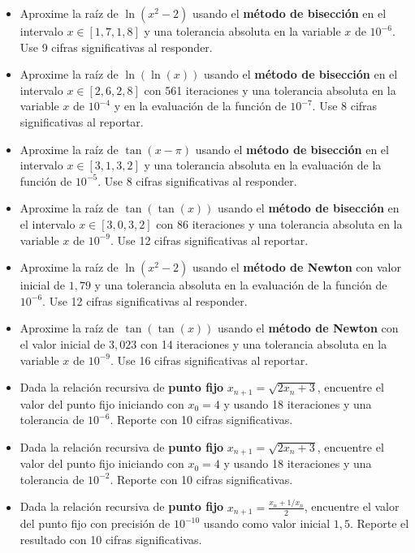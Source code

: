 \documentclass[12pt]{article}
\begin{document}
\begin{itemize}
\item Aproxime la raíz de \(\ln(x^2 - 2)\) usando el \textbf{método de bisección} en el intervalo \(x \in \left[1{,}7, 1{,}8\right]\) y una tolerancia absoluta en la variable \(x\) de \(10^{-6}\). Use 9 cifras significativas al responder.
\item Aproxime la raíz de \(\ln(\ln(x))\)  usando el \textbf{método de bisección} en el intervalo \(x \in \left[2{,}6, 2{,}8\right]\) con 561 iteraciones y una tolerancia absoluta en la variable \(x\) de \(10^{-4}\) y en la evaluación de la función de \(10^{-7}\). Use 8 cifras significativas al reportar.
\item Aproxime la raíz de \(\tan(x - \pi)\) usando el \textbf{método de bisección} en el intervalo \(x \in \left[3{,}1, 3{,}2\right]\) y una tolerancia absoluta en la evaluación de la función de \(10^{-5}\). Use 8 cifras significativas al responder.
\item Aproxime la raíz de \(\tan(\tan(x))\)  usando el \textbf{método de bisección} en el intervalo \(x \in \left[3{,}0, 3{,}2\right]\) con 86 iteraciones y una tolerancia absoluta en la variable \(x\) de \(10^{-9}\). Use 12 cifras significativas al reportar.
\item Aproxime la raíz de \(\ln(x^2 - 2)\)  usando el \textbf{método de Newton} con valor inicial de \(1{,}79\) y una tolerancia absoluta en la evaluación de la función de \(10^{-6}\). Use 12 cifras significativas al responder.
\item Aproxime la raíz de \(\tan(\tan(x))\)  usando el \textbf{método de Newton} con el valor inicial de \(3{,}023\) con 14 iteraciones y una tolerancia absoluta en la variable \(x\) de \(10^{-9}\). Use 16 cifras significativas al reportar.
\item Dada la relación recursiva de \textbf{punto fijo} \(x_{n+1}=\sqrt{2x_n+3}\), encuentre el valor del punto fijo iniciando con \(x_0=4\) y usando 18 iteraciones y una tolerancia de \(10^{-6}\). Reporte con 10 cifras significativas.
\item Dada la relación recursiva de \textbf{punto fijo} \(x_{n+1}=\sqrt{2x_n+3}\), encuentre el valor del punto fijo iniciando con \(x_0=4\) y usando 18 iteraciones y una tolerancia de \(10^{-2}\). Reporte con 10 cifras significativas.
\item Dada la relación recursiva de \textbf{punto fijo} \(x_{n+1} = \frac{x_n + 1/x_n}{2}\), encuentre el valor del punto fijo con precisión de \(10^{-10}\) usando como valor inicial \(1{,}5\). Reporte el resultado con 10 cifras significativas.

\end{itemize}
\end{document}
